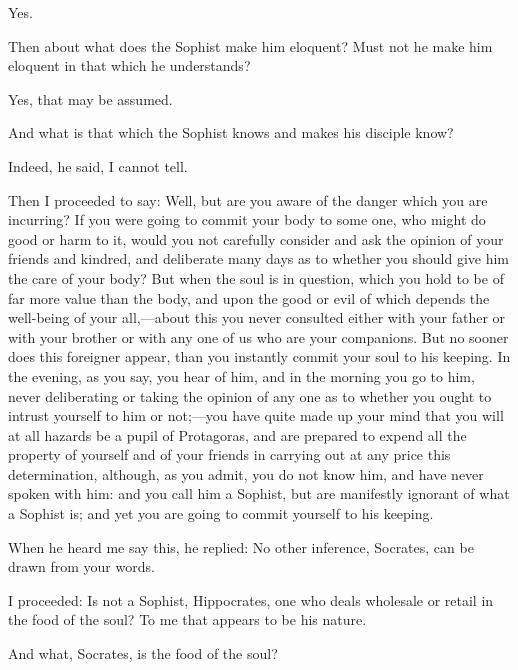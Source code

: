 \documentclass[11pt,letter]{article}
\begin{document}
\par  Yes.

\par  Then about what does the Sophist make him eloquent? Must not he make him eloquent in that which he understands?

\par  Yes, that may be assumed.

\par  And what is that which the Sophist knows and makes his disciple know?

\par  Indeed, he said, I cannot tell.

\par  Then I proceeded to say: Well, but are you aware of the danger which you are incurring? If you were going to commit your body to some one, who might do good or harm to it, would you not carefully consider and ask the opinion of your friends and kindred, and deliberate many days as to whether you should give him the care of your body? But when the soul is in question, which you hold to be of far more value than the body, and upon the good or evil of which depends the well-being of your all,—about this you never consulted either with your father or with your brother or with any one of us who are your companions. But no sooner does this foreigner appear, than you instantly commit your soul to his keeping. In the evening, as you say, you hear of him, and in the morning you go to him, never deliberating or taking the opinion of any one as to whether you ought to intrust yourself to him or not;—you have quite made up your mind that you will at all hazards be a pupil of Protagoras, and are prepared to expend all the property of yourself and of your friends in carrying out at any price this determination, although, as you admit, you do not know him, and have never spoken with him: and you call him a Sophist, but are manifestly ignorant of what a Sophist is; and yet you are going to commit yourself to his keeping.

\par  When he heard me say this, he replied: No other inference, Socrates, can be drawn from your words.

\par  I proceeded: Is not a Sophist, Hippocrates, one who deals wholesale or retail in the food of the soul? To me that appears to be his nature.

\par  And what, Socrates, is the food of the soul?
\end{document}
